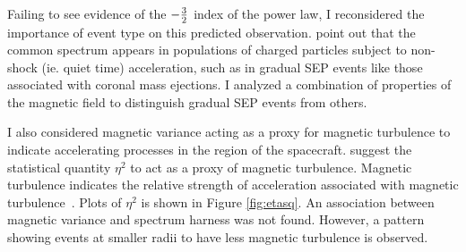 \documentclass[letterpaper,11pt]{article}
\begin{document}
Failing to see evidence of the $-{3 \over 2}$ index of the power law, I reconsidered the importance of event type on this predicted observation.  \citet{Fisk2006} point out that the common spectrum appears in populations of charged particles subject to non-shock (ie. quiet time) acceleration, such as in gradual SEP events like those associated with coronal mass ejections.  I analyzed a combination of properties of the magnetic field to distinguish gradual SEP events from others.  



I also considered magnetic variance acting as a proxy for magnetic turbulence to indicate accelerating processes in the region of the spacecraft.  \citet{Schwadron1996} suggest the statistical quantity $\eta^2$ to act as a proxy of magnetic turbulence.  Magnetic turbulence indicates the relative strength of acceleration associated with magnetic turbulence~\citep{Fisk2006}.  Plots of $\eta^2$ is shown in Figure \ref{fig:etasq}.  An association between magnetic variance and spectrum harness was not found.  However, a pattern showing events at smaller radii to have less magnetic turbulence is observed.
\end{document}

